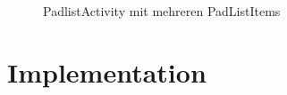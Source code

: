 \begin{figure}[h!]
    \centering
    \setlength\fboxsep{0pt}
	  \caption{PadlistActivity mit mehreren PadListItems}
	  \label{fig:settings}
\end{figure}

\section{Implementation}
\label{sec:implem}

